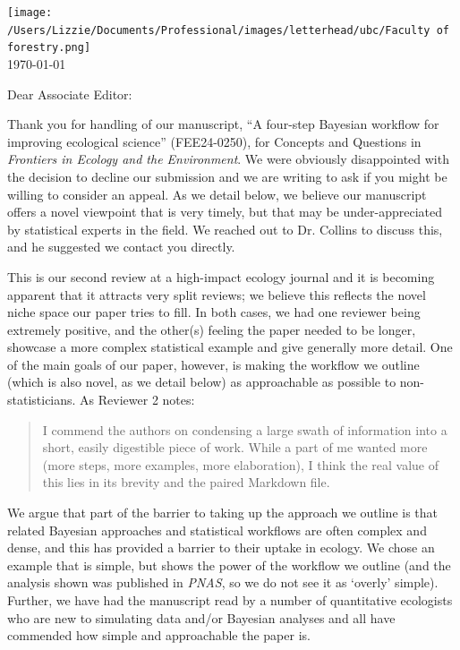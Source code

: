 \documentclass[11pt]{article}
\begin{document}

\renewcommand{\refname}{\CHead{}}

\hspace{-5ex} \texttt{[image: /Users/Lizzie/Documents/Professional/images/letterhead/ubc/Faculty of forestry.png]}
\vspace{1.5ex}\\

\setlength{\parindent}{0pt}
\setlength{\parskip}{7pt}
\today

Dear Associate Editor:

Thank you for handling of our manuscript, ``A four-step Bayesian workflow for improving ecological science'' (FEE24-0250), for Concepts and Questions in \emph{Frontiers in Ecology and the Environment}. We were obviously disappointed with the decision to decline our submission and we are writing to ask if you might be willing to consider an appeal. As we detail below, we believe our manuscript offers a novel viewpoint that is very timely, but that may be under-appreciated by statistical experts in the field. We reached out to Dr. Collins to discuss this, and he suggested we contact you directly. 

This is our second review at a high-impact ecology journal and it is becoming apparent that it attracts very split reviews; we believe this reflects the novel niche space our paper tries to fill. In both cases, we had one reviewer being extremely positive, and the other(s) feeling the paper needed to be longer, showcase a more complex statistical example and give generally more detail. One of the main goals of our paper, however, is making the workflow we outline (which is also novel, as we detail below) as approachable as possible to non-statisticians. As Reviewer 2 notes:
\begin{quote}
I commend the authors on condensing a large swath of information into a short, easily digestible piece of work. While a part of me
wanted more (more steps, more examples, more elaboration), I think the real value of this lies in its
brevity and the paired Markdown file.
\end{quote}
We argue that part of the barrier to taking up the approach we outline is that related Bayesian approaches and statistical workflows are often complex and dense, and this has provided a barrier to their uptake in ecology. We chose an example that is simple, but shows the power of the workflow we outline (and the analysis shown was published in \emph{PNAS}, so we do not see it as `overly' simple). Further, we have had the manuscript read by a number of quantitative ecologists who are new to simulating data and/or Bayesian analyses and all have commended how simple and approachable the paper is. 
\end{document}
